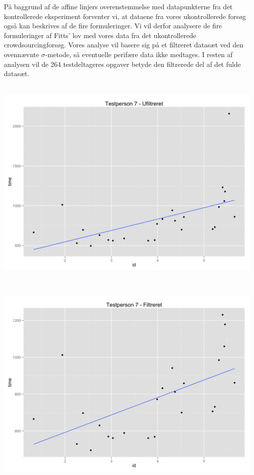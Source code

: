 \newpage
På baggrund af de affine linjers overenstemmelse med datapunkterne fra det kontrollerede eksperiment forventer vi, at dataene fra vores ukontrollerede forsøg også kan beskrives af de fire formuleringer. Vi vil derfor analysere de fire formuleringer af Fitts' lov med vores data fra det ukontrollerede crowdsourcingforsøg. Vores analyse vil basere sig på et filtreret datasæt ved den ovennævnte $\sigma$-metode, så eventuelle perifære data ikke medtages. I resten af analysen vil de 264 testdeltageres opgaver betyde den filtrerede del af det fulde datasæt.\\\\
\begin{minipage}{\linewidth}
	\begin{minipage}[t]{0.45\linewidth}
		\includegraphics[width=\textwidth]{images/plots/plot_model_test_comparison_unfiltered}
		\label{fig:testdeltager7unfilter}
	\end{minipage}
	\begin{minipage}[b]{0.1\linewidth}
	~
	\end{minipage}
	\begin{minipage}[t]{.45\linewidth}
		\includegraphics[width=\textwidth]{images/plots/plot_model_test_comparison_filtered}

\end{minipage}
\end{minipage}
